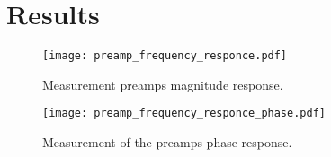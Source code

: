 \section*{Results}

\begin{figure}[htbp!]
	\centering
		\texttt{[image: preamp\_frequency\_responce.pdf]}
		\caption{Measurement \gls{preamp}s magnitude response.}
		\label{fig:appendix:preamp_amplitude}
\end{figure}

\begin{figure}[htbp!]
	\centering
		\texttt{[image: preamp\_frequency\_responce\_phase.pdf]}
		\caption{Measurement of the \gls{preamp}s phase response.}
		\label{fig:appendix:preamp_phase}
\end{figure}
